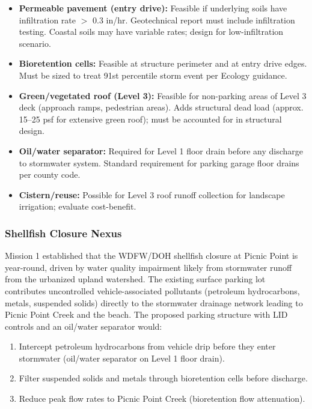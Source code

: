 \documentclass[11pt,letterpaper]{article}
\begin{document}
\begin{itemize}
  \item \textbf{Permeable pavement (entry drive):} Feasible if underlying soils have infiltration rate $>$ 0.3 in/hr. Geotechnical report must include infiltration testing. Coastal soils may have variable rates; design for low-infiltration scenario.
  \item \textbf{Bioretention cells:} Feasible at structure perimeter and at entry drive edges. Must be sized to treat 91st percentile storm event per Ecology guidance.
  \item \textbf{Green/vegetated roof (Level 3):} Feasible for non-parking areas of Level 3 deck (approach ramps, pedestrian areas). Adds structural dead load (approx. 15--25 psf for extensive green roof); must be accounted for in structural design.
  \item \textbf{Oil/water separator:} Required for Level 1 floor drain before any discharge to stormwater system. Standard requirement for parking garage floor drains per county code.
  \item \textbf{Cistern/reuse:} Possible for Level 3 roof runoff collection for landscape irrigation; evaluate cost-benefit.
\end{itemize}

\subsubsection{Shellfish Closure Nexus}

Mission 1 established that the WDFW/DOH shellfish closure at Picnic Point is year-round, driven by water quality impairment likely from stormwater runoff from the urbanized upland watershed. The existing surface parking lot contributes uncontrolled vehicle-associated pollutants (petroleum hydrocarbons, metals, suspended solids) directly to the stormwater drainage network leading to Picnic Point Creek and the beach. The proposed parking structure with LID controls and an oil/water separator would:

\begin{enumerate}
  \item Intercept petroleum hydrocarbons from vehicle drip before they enter stormwater (oil/water separator on Level 1 floor drain).
  \item Filter suspended solids and metals through bioretention cells before discharge.
  \item Reduce peak flow rates to Picnic Point Creek (bioretention flow attenuation).
\end{enumerate}
\end{document}
